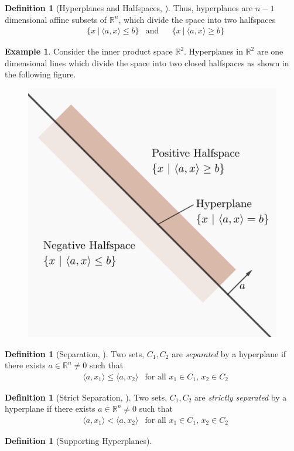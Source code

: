 \documentclass[11pt,reqno]{amsart}
\newcommand{\R}{\mathbb{R}}
\theoremstyle{plain}
\theoremstyle{definition}
\newtheorem{example}[theorem]{Example}
\newtheorem{definition}[theorem]{Definition}
\begin{document}
{\begin{definition}[{Hyperplanes and Halfspaces, \cite[2.2.1]{boyd_vandenberghe_2004}}]
    Thus, hyperplanes are $n-1$ dimensional affine subsets of $\R^n$, which divide the space into two halfspaces
    \begin{align*}
        &\{x\ |\ \langle a,x\rangle \leq b\} &\text{and}& &\{x\ |\ \langle a,x\rangle\geq b\}
    \end{align*}
\end{definition}
\smallskip
\begin{example}
    Consider the inner product space $\R^2$. Hyperplanes in $\R^2$ are one dimensional lines which divide the space into two closed halfspaces as shown in the following figure.
    \begin{figure}[h]
    \centering
    \begin{minipage}{.5\textwidth}
      \centering
      \includegraphics[height = 1.7 in]{halfspaces.png}
      \label{fig:test1}
    \end{minipage}%
    \end{figure}
\end{example}
\smallskip
\begin{definition}[{Separation, \cite[1.5.1]{bertsekas2009convex}}]
    Two sets, $C_1,C_2$ are \emph{separated} by a hyperplane if there exists $a\in\R^n\neq 0$ such that 
    \begin{align*}
        &\langle a,x_1\rangle \leq \langle a,x_2\rangle & \text{for all $x_1\in C_1$, $x_2\in C_2$}
    \end{align*}
\end{definition}
\smallskip
\begin{definition}[{Strict Separation, \cite[1.5.3]{bertsekas2009convex}}]
    Two sets, $C_1,C_2$ are \emph{strictly separated} by a hyperplane if there exists $a\in\R^n\neq 0$ such that
    \begin{align*}
        &\langle a,x_1\rangle < \langle a,x_2\rangle & \text{for all $x_1\in C_1$, $x_2\in C_2$}
    \end{align*}
\end{definition}
\smallskip
\begin{definition}[Supporting Hyperplanes]

\end{definition}}
\end{document}
